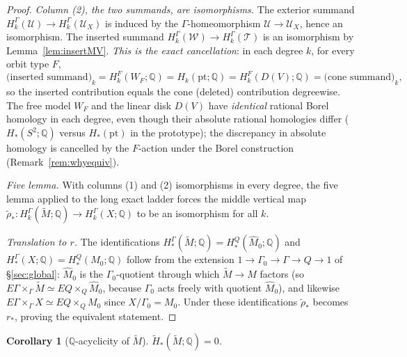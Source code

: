 \documentclass[12pt]{article}
\newtheorem{corollary}[theorem]{Corollary}
\theoremstyle{definition}
\begin{document}
\begin{proof}
\emph{Column (2), the two summands, are isomorphisms.} The exterior summand
$H^\Gamma_k(\mathcal U)\to H^\Gamma_k(\mathcal U_X)$ is induced by the
$\Gamma$-homeomorphism $\mathcal U\to\mathcal U_X$, hence an isomorphism. The
inserted summand $H^\Gamma_k(\mathcal W)\to H^\Gamma_k(\mathcal T)$ is an
isomorphism by Lemma~\ref{lem:insertMV}. \emph{This is the exact cancellation}: in
each degree $k$, for every orbit type $F$,
\[
   \big(\text{inserted summand}\big)_k
   =H^F_k(W_F;\mathbb{Q})=H_k(\mathrm{pt};\mathbb{Q})
   =H^F_k(D(V);\mathbb{Q})=\big(\text{cone summand}\big)_k ,
\]
so the inserted contribution equals the cone (deleted) contribution degreewise.
The free model $W_F$ and the linear disk $D(V)$ have \emph{identical} rational
Borel homology in each degree, even though their absolute rational homologies
differ ($H_*(S^2;\mathbb{Q})$ versus $H_*(\mathrm{pt})$ in the prototype); the
discrepancy in absolute homology is cancelled by the $F$-action under the Borel
construction (Remark~\ref{rem:whyequiv}).

\emph{Five lemma.} With columns (1) and (2) isomorphisms in every degree, the five
lemma applied to the long exact ladder forces the middle vertical map
$\widetilde\rho_*\colon H^\Gamma_k(\widetilde M;\mathbb{Q})\to
H^\Gamma_k(X;\mathbb{Q})$ to be an isomorphism for all $k$.

\emph{Translation to $r$.} The identifications
$H^\Gamma_*(\widetilde M;\mathbb{Q})=H^Q_*(\widehat M_0;\mathbb{Q})$ and
$H^\Gamma_*(X;\mathbb{Q})=H^Q_*(M_0;\mathbb{Q})$ follow from the extension
$1\to\Gamma_0\to\Gamma\to Q\to1$ of \S\ref{sec:global}: $\widehat M_0$ is the
$\Gamma_0$-quotient through which $\widetilde M\to M$ factors (so
$E\Gamma\times_\Gamma\widetilde M\simeq EQ\times_Q\widehat M_0$, because
$\Gamma_0$ acts freely with quotient $\widehat M_0$), and likewise
$E\Gamma\times_\Gamma X\simeq EQ\times_Q M_0$ since $X/\Gamma_0=M_0$. Under these
identifications $\widetilde\rho_*$ becomes $r_*$, proving the equivalent
statement.
\end{proof}

\begin{corollary}[$\mathbb{Q}$-acyclicity of $\widetilde M$]
\label{cor:nonequiv}
$\widetilde H_*(\widetilde M;\mathbb{Q})=0$.
\end{corollary}
\end{document}

